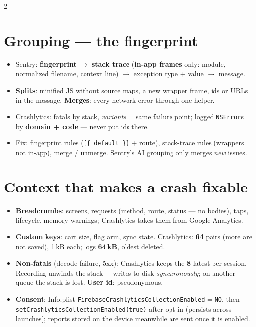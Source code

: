 \documentclass[8pt]{extarticle}
\newcommand\ct[1]{\texttt{#1}}
\begin{document}
\begin{multicols}{2}
\section{Grouping — the fingerprint}
\begin{itemize}
  \item Sentry: \textbf{fingerprint} $\to$ \textbf{stack trace} (\textbf{in-app frames} only:
        module, normalized filename, context line) $\to$ exception type + value $\to$ message.
  \item \textbf{Splits}: minified JS without source maps, a new wrapper frame, ids or URLs in
        the message. \textbf{Merges}: every network error through one helper.
  \item Crashlytics: fatals by stack, \emph{variants} = same failure point; logged
        \ct{NSError}s by \textbf{domain + code} — never put ids there.
  \item Fix: fingerprint rules (\ct{\{\{ default \}\}} + route), stack-trace rules (wrappers
        not in-app), merge / unmerge. Sentry's AI grouping only merges \emph{new} issues.
\end{itemize}

\section{Context that makes a crash fixable}
\begin{itemize}
  \item \textbf{Breadcrumbs}: screens, requests (method, route, status — no bodies), taps,
        lifecycle, memory warnings; Crashlytics takes them from Google Analytics.
  \item \textbf{Custom keys}: cart size, flag arm, sync state. Crashlytics: \textbf{64}
        pairs (more are not saved), 1\,kB each; logs \textbf{64\,kB}, oldest deleted.
  \item \textbf{Non-fatals} (decode failure, 5xx): Crashlytics keeps the \textbf{8} latest per
        session. Recording unwinds the stack + writes to disk \emph{synchronously}; on
        another queue the stack is lost. \textbf{User id}: pseudonymous.
  \item \textbf{Consent}: Info.plist \ct{FirebaseCrashlyticsCollectionEnabled} = \ct{NO}, then
        \ct{setCrashlyticsCollectionEnabled(true)} after opt-in (persists across launches);
        reports stored on the device meanwhile are sent once it is enabled.
\end{itemize}


\end{multicols}
\end{document}
